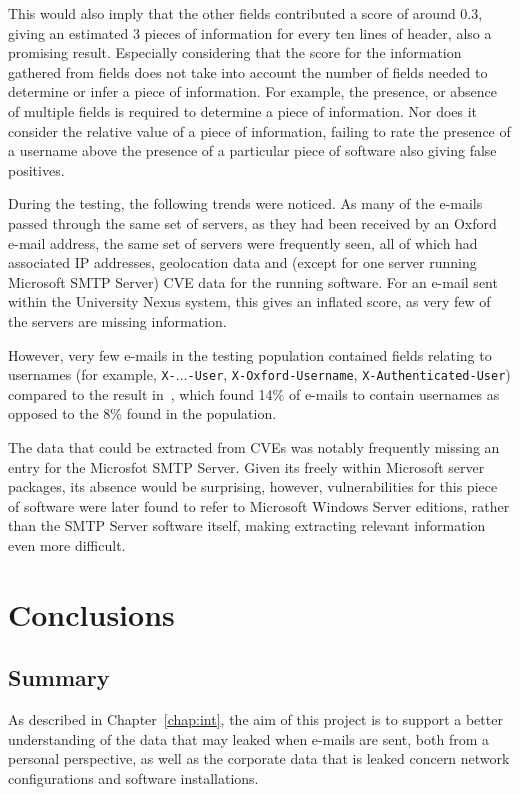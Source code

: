 This would also imply that the other fields contributed a score of around 0.3,
giving an estimated 3 pieces of information for every ten lines of header, also
a promising result. Especially considering that the score for the information
gathered from fields does not take into account the number of fields needed to
determine or infer a piece of information. For example, the presence, or
absence of multiple fields is required to determine a piece of information.
Nor does it consider the relative value of a piece of information, failing to
rate the presence of a username above the presence of a particular piece of
software also giving false positives.

During the testing, the following trends were noticed.  As many of the e-mails
passed through the same set of servers, as they had been received by an Oxford
e-mail address, the same set of servers were frequently seen, all of which had
associated IP addresses, geolocation data and (except for one server running
Microsoft SMTP Server) CVE data for the running software.  For an e-mail sent
within the University Nexus system, this gives an inflated score, as very few
of the servers are missing information.

However, very few e-mails in the testing population contained fields relating
to usernames (for example, \texttt{X-}$\ldots$\texttt{-User}, \texttt{X-Oxford-Username},
\texttt{X-Authenticated-User}) compared to the result
in~\cite{nurse2015investigating}, which found 14\% of e-mails to contain
usernames as opposed to the 8\% found in the population.

The data that could be extracted from CVEs was notably frequently missing an
entry for the Microsfot SMTP Server.  Given its freely within Microsoft server
packages, its absence would be surprising, however, vulnerabilities for this
piece of software were later found to refer to Microsoft Windows Server
editions, rather than the SMTP Server software itself, making extracting
relevant information even more difficult.

\cleardoublepage \chapter{Conclusions}
\section{Summary}

As described in Chapter~\ref{chap:int}, the aim of this project is to support a
better understanding of the data that may leaked when e-mails are sent, both
from a personal perspective, as well as the corporate data that is leaked
concern network configurations and software installations.

